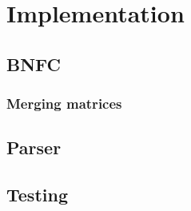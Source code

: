 \chapter{Implementation}

\section{BNFC}
\subsection{Merging matrices}

\section{Parser}

\section{Testing}

